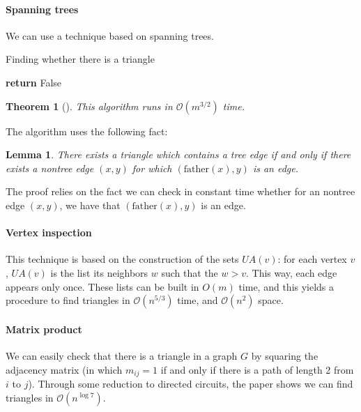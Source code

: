 \documentclass[11pt,a4paper]{article}
\newcommand{\BigO}{\mathcal O}
\newtheorem{Theo}{Theorem}
\newtheorem{Lemma}{Lemma}
\theoremstyle{definition}
\begin{document}
\paragraph{Spanning trees} 
We can use a technique based on spanning trees. 


\begin{algorithm}
  \LinesNumbered
  \SetAlgoVlined
   
  \caption{Finding whether there is a triangle}
  \label{triangle_alg}

  \textbf{return} False\;
\end{algorithm}

\begin{Theo}[\cite{itai1978finding}]
This algorithm runs in $\BigO(m^{3/2})$ time.
\end{Theo}
The algorithm uses the following fact:
\begin{Lemma}{}
There exists a triangle which contains a tree edge if and only if there 
exists a nontree edge $(x,y)$ for which $(\mathrm{father}(x),y)$ is an edge.
\end{Lemma}
The proof relies on the fact we can check in constant time whether for an
nontree edge $(x,y)$, we have that $(\mathrm{father}(x),y)$ is an edge.

\paragraph{Vertex inspection}
This technique is based on the construction of the sets 
$UA(v)$: for each vertex $v$, $UA(v)$ is the list its neighbors $w$ such
that the $w > v$. This way, each edge appears only once. These lists
can be built in $O(m)$ time, and this yields a procedure
to find triangles in $\BigO(n^{5/3})$ time, and $\BigO(n^2)$ space.

\paragraph{Matrix product}
We can easily check that there is a triangle in a graph $G$ by
squaring the adjacency matrix (in which $m_{ij}=1$ if and only if
there is a path of length 2 from $i$ to $j$). Through some reduction
to directed circuits, the paper shows we can find
triangles in $\BigO(n^{\log 7})$.
\end{document}
